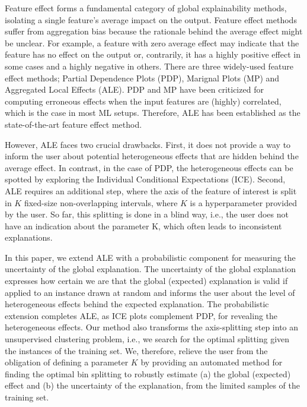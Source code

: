 \documentclass[twoside]{article}
\begin{document}
Feature effect\citep{Gromping2020MAEP} forms a fundamental category of
global explainability methods, isolating a single feature's average
impact on the output. Feature effect methods suffer from aggregation
bias because the rationale behind the average effect might be
unclear. For example, a feature with zero average effect may indicate
that the feature has no effect on the output or, contrarily, it has a
highly positive effect in some cases and a highly negative in
others. There are three widely-used feature effect methods; Partial
Dependence Plots (PDP)\citep{friedman2001greedy}, Marignal Plots
(MP)\citep{apley2020visualizing} and Aggregated Local Effects
(ALE)\citep{apley2020visualizing}. PDP and MP have been criticized for
computing erroneous effects when the input features are (highly)
correlated, which is the case in most ML setups. Therefore, ALE has
been established as the state-of-the-art feature effect method.

However, ALE faces two crucial drawbacks. First, it does not provide a
way to inform the user about potential heterogeneous effects that are
hidden behind the average effect. In contrast, in the case of PDP, the
heterogeneous effects can be spotted by exploring the Individual
Conditional Expectations (ICE)\citep{goldstein2015peeking}. Second,
ALE requires an additional step, where the axis of the feature of
interest is split in \(K\) fixed-size non-overlapping intervals, where
\(K\) is a hyperparameter provided by the user. So far, this splitting
is done in a blind way, i.e., the user does not have an indication
about the parameter K, which often leads to inconsistent explanations.

In this paper, we extend ALE with a probabilistic component for
measuring the uncertainty of the global explanation. The uncertainty
of the global explanation expresses how certain we are that the global
(expected) explanation is valid if applied to an instance drawn at
random and informs the user about the level of heterogeneous effects
behind the expected explanation. The probabilistic extension completes
ALE, as ICE plots complement PDP, for revealing the heterogeneous
effects. Our method also transforms the axis-splitting step into an
unsupervised clustering problem, i.e., we search for the optimal
splitting given the instances of the training set. We, therefore,
relieve the user from the obligation of defining a parameter \(K\) by
providing an automated method for finding the optimal bin splitting to
robustly estimate (a) the global (expected) effect and (b) the
uncertainty of the explanation, from the limited samples of the
training set.
\end{document}
